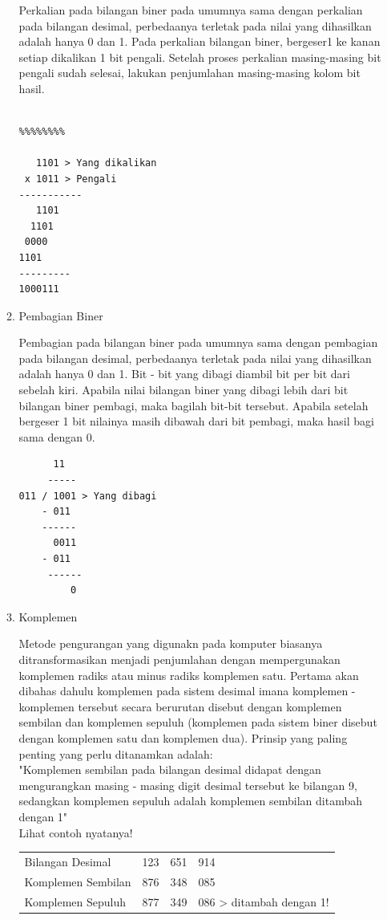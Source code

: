 \begin{enumerate}[label=(\alph*)]
\begin{enumerate}
\qquad Perkalian pada bilangan biner pada umumnya sama dengan perkalian pada bilangan desimal, perbedaanya terletak pada nilai yang dihasilkan adalah hanya 0 dan 1. Pada perkalian bilangan biner, bergeser1 ke kanan setiap dikalikan 1 bit pengali. Setelah proses perkalian masing-masing bit pengali sudah selesai, lakukan penjumlahan masing-masing kolom bit hasil.
\begin{verbatim}

%%%%%%%%

   1101 > Yang dikalikan
 x 1011 > Pengali
-----------
   1101
  1101
 0000
1101
---------
1000111
\end{verbatim}


\item Pembagian Biner

\qquad Pembagian pada bilangan biner pada umumnya sama dengan pembagian pada bilangan desimal, perbedaanya terletak pada nilai yang dihasilkan  adalah hanya 0 dan 1. Bit - bit yang dibagi diambil bit per bit dari sebelah kiri. Apabila nilai bilangan biner yang dibagi lebih dari bit bilangan biner pembagi, maka bagilah bit-bit tersebut. Apabila setelah bergeser 1 bit nilainya masih dibawah dari bit pembagi, maka hasil bagi sama dengan 0.
\begin{verbatim}
      11
     -----
011 / 1001 > Yang dibagi
    - 011
    ------
      0011
    - 011
     ------
         0
\end{verbatim}


\item Komplemen

\qquad Metode pengurangan yang digunakn pada komputer biasanya ditransformasikan menjadi penjumlahan dengan mempergunakan komplemen radiks atau minus radiks komplemen satu. Pertama akan dibahas dahulu komplemen pada sistem desimal imana komplemen - komplemen tersebut secara berurutan disebut dengan komplemen sembilan dan komplemen sepuluh (komplemen pada sistem biner disebut dengan komplemen satu dan komplemen dua). Prinsip yang paling penting yang perlu ditanamkan adalah: \\

\qquad "Komplemen sembilan pada bilangan desimal didapat dengan mengurangkan masing - masing digit desimal tersebut ke bilangan 9, sedangkan komplemen sepuluh adalah komplemen sembilan ditambah dengan 1" \\
Lihat contoh nyatanya!\\

\begin{tabular}{ l l l l }
Bilangan Desimal & 123 & 651 & 914 \\
Komplemen Sembilan &876 &348 &085 \\ 
Komplemen Sepuluh &877 &349 &086 > ditambah dengan 1! \\
\end{tabular}\\


\end{enumerate}
\end{enumerate}
